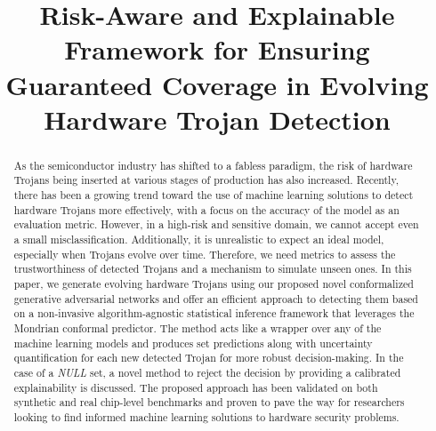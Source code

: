 \documentclass[9pt,conference]{IEEEtran}
\begin{document}
\title{Risk-Aware and Explainable Framework for Ensuring Guaranteed Coverage in Evolving Hardware Trojan Detection
}




\author{
\and
{}
}

\maketitle

\begin{abstract}
As the semiconductor industry has shifted to a fabless paradigm, the risk of hardware Trojans being inserted at various stages of production has also increased. Recently, there has been a growing trend toward the use of machine learning solutions to detect hardware Trojans more effectively, with a focus on the accuracy of the model as an evaluation metric. However, in a high-risk and sensitive domain, we cannot accept even a small misclassification. Additionally, it is unrealistic to expect an ideal model, especially when Trojans evolve over time. Therefore, we need metrics to assess the trustworthiness of detected Trojans and a mechanism to simulate unseen ones. In this paper, we generate evolving hardware Trojans using our proposed novel conformalized generative adversarial networks and offer an efficient approach to detecting them based on a non-invasive algorithm-agnostic statistical inference framework that leverages the Mondrian conformal predictor. The method acts like a wrapper over any of the machine learning models and produces set predictions along with uncertainty quantification for each new detected Trojan for more robust decision-making. In the case of a \textit{NULL} set, a novel method to reject the decision by providing a calibrated explainability is discussed. The proposed approach has been validated on both synthetic and real chip-level benchmarks and proven to pave the way for researchers looking to find informed machine learning solutions to hardware security problems.
\end{abstract}
\end{document}
